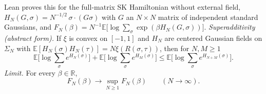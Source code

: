 \begin{theorem}\label{thm:sg-tal:gt}
  \leanok
{}
Lean proves this for the full-matrix SK Hamiltonian without external field, $H_N(G,\sigma)=N^{-1/2}\,\sigma\cdot(G\sigma)$ with $G$ an $N\times N$ matrix of independent standard Gaussians, and $F_N(\beta)=N^{-1}\mathbb{E}\big[\log\sum_\sigma\exp(\beta H_N(G,\sigma))\big]$.
\emph{Superadditivity (abstract form).} If $\xi$ is convex on $[-1,1]$ and $H_N$ are centered Gaussian fields on $\Sigma_N$ with $\mathbb{E}[H_N(\sigma)H_N(\tau)]=N\xi(R(\sigma,\tau))$, then for $N,M\ge1$
\[
\mathbb{E}\Big[\log\sum_\sigma e^{H_N(\sigma)}\Big]+\mathbb{E}\Big[\log\sum_\sigma e^{H_M(\sigma)}\Big]\le \mathbb{E}\Big[\log\sum_\sigma e^{H_{N+M}(\sigma)}\Big].
\]
\emph{Limit.} For every $\beta\in\mathbb R$,
\[
F_N(\beta)\longrightarrow \sup_{N\ge1}F_N(\beta)\qquad(N\to\infty).
\]
\end{theorem}
